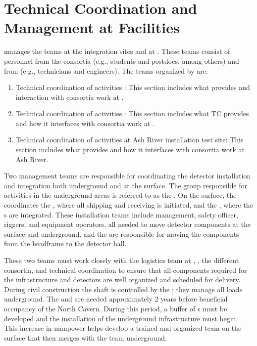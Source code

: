 \chapter{Technical Coordination and Management at Facilities}
\label{vl:tc-facility_mgmt}

  manages the teams at the integration sites and
at \surf. These teams consist of personnel from the consortia
(e.g., students and postdocs, among others) and from  (e.g., technicians and
engineers). The teams organized by  are:
\begin{enumerate}
 \item Technical coordination of activities \surf: This section
   includes what  provides and interaction with consortia work
   at \surf.
 \item Technical coordination of activities : This section includes
   what TC provides and how it interfaces with consortia work at .
 \item Technical coordination of activities at Ash River installation
   test site: This section includes what  provides and how it
   interfaces with consortia work at Ash River. 
\end{enumerate}



Two management teams are responsible for coordinating the detector
installation and integration both underground and at the surface. The
group responsible for activities in the underground areas is referred
to as the .  On the surface, the  coordinates
the , where all  shipping and receiving is
initiated, and the , where the s are integrated.
These installation teams include management, safety officer, riggers,
and equipment operators, all needed to move detector components at the
surface and underground. \surf and the   are responsible for moving the components from
the headframe to the detector hall.

These two teams must work closely with the  logistics team at
\surf, , the different consortia, and technical coordination to
ensure that all components required for the infrastructure and
detectors are well organized and scheduled for delivery. During
civil construction the shaft is controlled by the ; they manage all loads
underground.  The  and  are
needed approximately 2 years before beneficial occupancy of the North
Cavern.  During this period, a buffer of s must be developed 
and  the installation of the underground infrastructure must begin. This
increase in manpower helps develop a trained and organized team on the
surface that then merges with the team underground.


